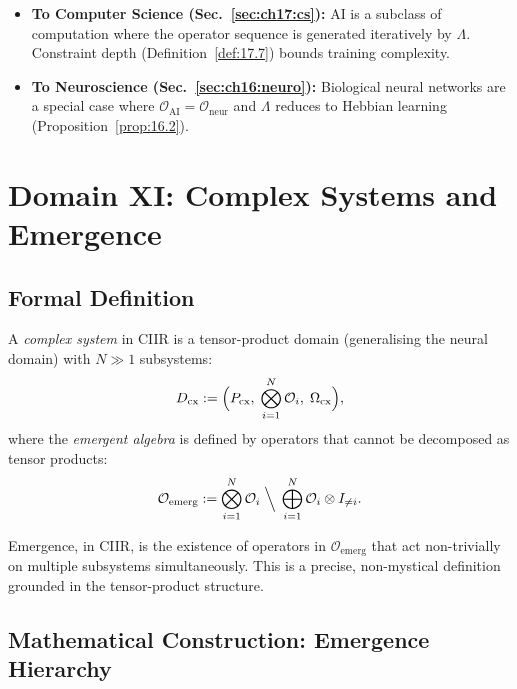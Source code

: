 \begin{itemize}
  \item \textbf{To Computer Science (Sec.~\ref{sec:ch17:cs}):}
        AI is a subclass of computation where the operator sequence
        is generated iteratively by $\Lambda$.  Constraint depth
        (Definition~\ref{def:17.7}) bounds training complexity.
  \item \textbf{To Neuroscience (Sec.~\ref{sec:ch16:neuro}):}
        Biological neural networks are a special case where
        $\mathcal{O}_{\mathrm{AI}} = \mathcal{O}_{\mathrm{neur}}$
        and $\Lambda$ reduces to Hebbian learning
        (Proposition~\ref{prop:16.2}).
\end{itemize}

\section{Domain XI: Complex Systems and Emergence}
\label{sec:ch18:complex}

\subsection{Formal Definition}

\begin{definition}\label{def:18.2}
A \emph{complex system} in CIIR is a tensor-product domain
(generalising the neural domain) with $N \gg 1$ subsystems:
\[
  D_{\mathrm{cx}} := \Bigl( P_{\mathrm{cx}},\;
  \bigotimes_{i=1}^N \mathcal{O}_i,\;
  \Omega_{\mathrm{cx}} \Bigr),
\]
where the \emph{emergent algebra} is defined by operators that cannot
be decomposed as tensor products:
\[
  \mathcal{O}_{\mathrm{emerg}} :=
  \bigotimes_{i=1}^N \mathcal{O}_i \;\Big\backslash\;
  \bigoplus_{i=1}^N \mathcal{O}_i \otimes I_{\neq i}.
\]
\end{definition}

\begin{remark}
Emergence, in CIIR, is the existence of operators in
$\mathcal{O}_{\mathrm{emerg}}$ that act non-trivially on multiple
subsystems simultaneously.  This is a precise, non-mystical
definition grounded in the tensor-product structure.
\end{remark}

\subsection{Mathematical Construction: Emergence Hierarchy}

